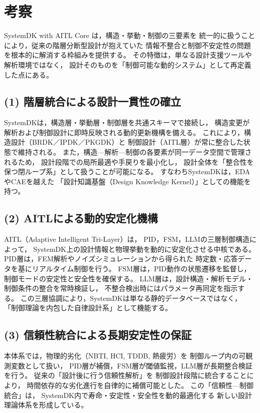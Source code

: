 \section{考察}

SystemDK with AITL Core は，構造・挙動・制御の三要素を
統一的に扱うことにより，従来の階層分断型設計が抱えていた
情報不整合と制御不安定性の問題を根本的に解消する枠組みを提供する。
その特徴は，単なる設計支援ツールや解析環境ではなく，
設計そのものを「制御可能な動的システム」として再定義した点にある。

\subsection{(1) 階層統合による設計一貫性の確立}
SystemDKは，構造層・挙動層・制御層を共通スキーマで接続し，
構造変更が解析および制御設計に即時反映される動的更新機構を備える。
これにより，構造設計（BRDK／IPDK／PKGDK）と
制御設計（AITL層）が常に整合した状態で維持される。
また，構造—解析—制御の各要素が同一データ空間で管理されるため，
設計段階での局所最適や手戻りを最小化し，
設計全体を「整合性を保つ閉ループ系」として扱うことが可能になる。
すなわちSystemDKは，EDAやCAEを越えた
「設計知識基盤（Design Knowledge Kernel）」としての機能を持つ。

\subsection{(2) AITLによる動的安定化機構}
AITL（Adaptive Intelligent Tri-Layer）は，
PID，FSM，LLMの三層制御構造によって，
SystemDK上の設計情報と物理挙動を動的に安定化させる中核である。
PID層は，FEM解析やノイズシミュレーションから得られた
時定数・応答データを基にリアルタイム制御を行う。
FSM層は，PID動作の状態遷移を監督し，
制御モードの安定性と安全性を確保する。
LLM層は，設計構造・解析モデル・制御条件の整合を常時検証し，
不整合検出時にはパラメータ再同定を指示する。
この三層協調により，SystemDKは単なる静的データベースではなく，
「制御理論を内包した自律設計系」として機能する。

\subsection{(3) 信頼性統合による長期安定性の保証}
本体系では，物理的劣化（NBTI, HCI, TDDB, 熱疲労）を
制御ループ内の可観測変数として扱い，
PID層が補償，FSM層が閾値監視，LLM層が長期整合検証を行う。
従来の「設計後に行う信頼性解析」を
制御設計段階に統合することにより，
時間依存的な劣化進行を自律的に補償可能とした。
この「信頼性—制御統合」は，
SystemDK内で寿命・安定性・安全性を動的最適化する
新しい設計理論体系を形成している。

